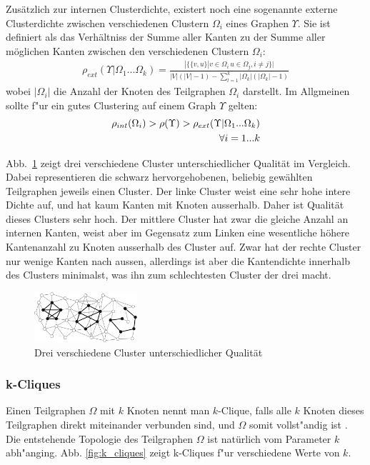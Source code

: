 \documentclass[journal]{vgtc}
\begin{document}
  Zusätzlich zur internen Clusterdichte, existert noch eine sogenannte externe Clusterdichte 
  zwischen verschiedenen Clustern $\Omega_i$ eines Graphen $\Upsilon$. Sie ist definiert als
  das Verhältniss der Summe aller Kanten zu der Summe aller möglichen Kanten zwischen den
  verschiedenen Clustern $\Omega_i$:
    \begin{align}
      \rho_{ext}(\Upsilon|\Omega_1 ... \Omega_k) = \frac{|\{\{v,u\} | v\in \Omega_i\, u \in \Omega_j, i \neq j\}|}
                                                        {|V|(|V|-1)-\sum\limits_{l=1}^k |\Omega_k|(|\Omega_k|-1)}
    \end{align}
  wobei $|\Omega_i|$ die Anzahl der Knoten des Teilgraphen $\Omega_i$ darstellt.
  Im Allgmeinen sollte f"ur ein gutes Clustering auf einem Graph $\Upsilon$ gelten:
    \begin{align}
      \rho_{int}(\Omega_i) > \rho(\Upsilon) > \rho_{ext}(\Upsilon|\Omega_1 ... \Omega_k) \\ 
      			\forall i=1...k \notag
    \end{align}
  
  Abb.~\ref{fig:comp_cluster} zeigt drei verschiedene Cluster unterschiedlicher Qualität im Vergleich.
  Dabei representieren die schwarz hervorgehobenen, beliebig gewählten Teilgraphen jeweils 
  einen Cluster. Der linke Cluster weist eine sehr hohe intere
  Dichte auf, und hat kaum Kanten mit Knoten ausserhalb. Daher ist Qualität dieses Clusters
  sehr hoch. Der mittlere Cluster hat zwar die gleiche Anzahl an internen Kanten, weist
  aber im Gegensatz zum Linken eine wesentliche höhere Kantenanzahl zu Knoten ausserhalb des
  Cluster auf. Zwar hat der rechte Cluster nur wenige Kanten nach aussen, allerdings ist aber
  die Kantendichte innerhalb des Clusters minimalst, was ihn zum schlechtesten Cluster der drei macht.

  \begin{figure}[h]
    \centering
    \includegraphics[width=1.5in]{images/good_cluster}
    \caption{\label{fig:comp_cluster} Drei verschiedene Cluster unterschiedlicher Qualität \cite{Schaeffer}}
  \end{figure}
  
  \subsubsection{k-Cliques}
  \label{sec:k_cliques}
  	Einen Teilgraphen $\Omega$ mit $k$ Knoten nennt man $k$-Clique, falls alle $k$ Knoten dieses 
  	Teilgraphen direkt miteinander verbunden sind, und $\Omega$ somit vollst"andig ist \cite{CPM}. 
  	Die entstehende Topologie des Teilgraphen $\Omega$ ist natürlich vom Parameter $k$ abh"anging.
  	Abb. \ref{fig:k_cliques} zeigt k-Cliques f"ur verschiedene Werte von $k$.
  	
\end{document}
